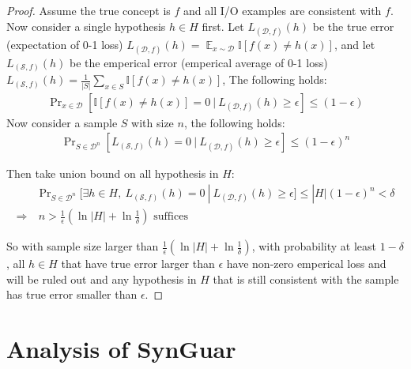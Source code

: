 \documentclass[11pt]{extarticle}
\newcommand{\tool}{{\sc SynGuar}\xspace}
\newcommand{\prb}{\mathop{\text{Pr}}}
\begin{document}
\begin{proof}
Assume the true concept is $f$ and all I/O examples are consistent with $f$.
Now consider a single hypothesis $h\in H$ first.
Let $L_{(\mathcal{D},f)}(h)$ be the true error (expectation of 0-1 loss) $L_{(\mathcal{D},f)}(h)=\mathop{\mathbb{E}}_{x\sim\mathcal{D}}\mathbb{I}[f(x)\neq h(x)]$,
and let $L_{(\mathcal{S},f)}(h)$ be the emperical error (emperical average of 0-1 loss) $L_{(\mathcal{S},f)}(h)=\frac{1}{|S|}\sum_{x\in S}\mathbb{I}[f(x)\neq h(x)]$,
The following holds:
\begin{align*}
\prb_{x\in \mathcal{D}} [\mathbb{I}[f(x)\neq h(x)] = 0 ~|~ L_{(\mathcal{D},f)}(h) \geq \epsilon] \leq (1-\epsilon)
\end{align*}
Now consider a sample $S$ with size $n$, the following holds:
\begin{align*}
\prb_{S\in \mathcal{D}^{n}} [L_{(\mathcal{S},f)}(h) = 0 ~|~ L_{(\mathcal{D},f)}(h) \geq \epsilon] \leq (1-\epsilon)^{n}
\end{align*}

Then take union bound on all hypothesis in $H$:
\begin{align*}
    &\prb_{S\in \mathcal{D}^{n}} [\exists h\in H, ~L_{(\mathcal{S},f)}(h) = 0 ~|~ L_{(\mathcal{D},f)}(h) \geq \epsilon] \leq |H|(1-\epsilon)^{n} < \delta\\
    \Rightarrow & ~n > \frac{1}{\epsilon}(\ln |H| + \ln
    \frac{1}{\delta}) \text{ suffices}
\end{align*}

So with sample size larger than $\frac{1}{\epsilon}(\ln |H| + \ln
\frac{1}{\delta})$, with probability at least $1-\delta$, all $h\in H$ that 
have true error larger than $\epsilon$ have non-zero emperical loss and will be ruled out
and any hypothesis in $H$ that is still consistent with the sample has 
true error smaller than $\epsilon$.

\end{proof}

\section{Analysis of \tool}
\end{document}
